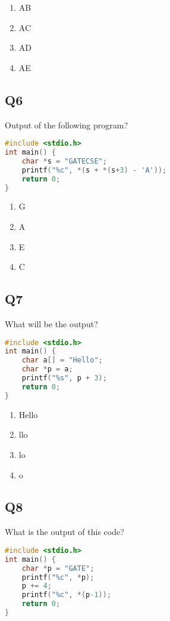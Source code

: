\begin{enumerate}[label=(\alph*)]
    \item AB  
    \item AC  
    \item AD  
    \item AE
\end{enumerate}

\subsection*{Q6}
Output of the following program?
\begin{lstlisting}[language=C]
#include <stdio.h>
int main() {
    char *s = "GATECSE";
    printf("%c", *(s + *(s+3) - 'A'));
    return 0;
}
\end{lstlisting}

\begin{enumerate}[label=(\alph*)]
    \item G  
    \item A  
    \item E  
    \item C
\end{enumerate}

\newpage
\subsection*{Q7}
What will be the output?
\begin{lstlisting}[language=C]
#include <stdio.h>
int main() {
    char a[] = "Hello";
    char *p = a;
    printf("%s", p + 3);
    return 0;
}
\end{lstlisting}

\begin{enumerate}[label=(\alph*)]
    \item Hello  
    \item llo  
    \item lo  
    \item o
\end{enumerate}

\subsection*{Q8}
What is the output of this code?
\begin{lstlisting}[language=C]
#include <stdio.h>
int main() {
    char *p = "GATE";
    printf("%c", *p);
    p += 4;
    printf("%c", *(p-1));
    return 0;
}
\end{lstlisting}

